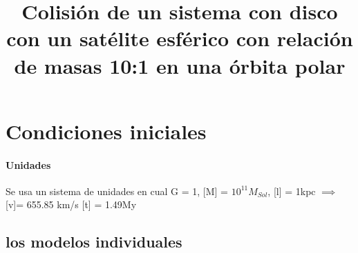 \documentclass[12pt]{article} %
\renewcommand{\=}[1]{\stackrel{#1}{=}} %
\theoremstyle{definition}
\theoremstyle{remark}
\begin{document}
\title{Colisión de un sistema con disco con un satélite esférico con relación de masas 10:1 en una órbita polar}
\section*{Condiciones iniciales}

\paragraph{Unidades}
Se usa un sistema de unidades en cual G = 1, [M] = $10^{11} M_{Sol}$, [l] = 1kpc $\implies$ [v]= 655.85 km/s [t] = 1.49My


\subsection*{los modelos individuales}
\end{document}
